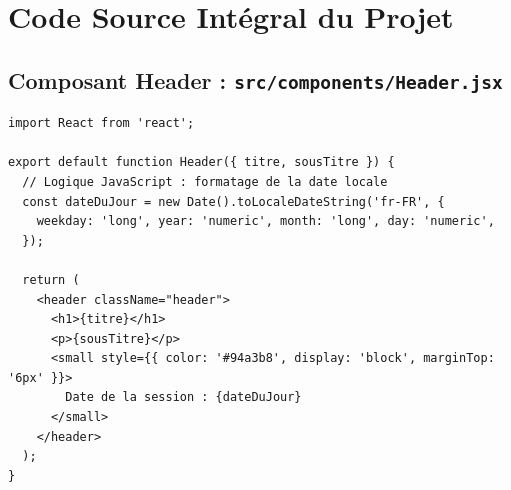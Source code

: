 \documentclass[12pt, a4paper]{article}
\begin{document}
\newpage
\section{Code Source Intégral du Projet}

\subsection{Composant Header : \texttt{src/components/Header.jsx}}
\begin{lstlisting}
import React from 'react';

export default function Header({ titre, sousTitre }) {
  // Logique JavaScript : formatage de la date locale
  const dateDuJour = new Date().toLocaleDateString('fr-FR', {
    weekday: 'long', year: 'numeric', month: 'long', day: 'numeric',
  });

  return (
    <header className="header">
      <h1>{titre}</h1>
      <p>{sousTitre}</p>
      <small style={{ color: '#94a3b8', display: 'block', marginTop: '6px' }}>
        Date de la session : {dateDuJour}
      </small>
    </header>
  );
}
\end{lstlisting}
\end{document}
